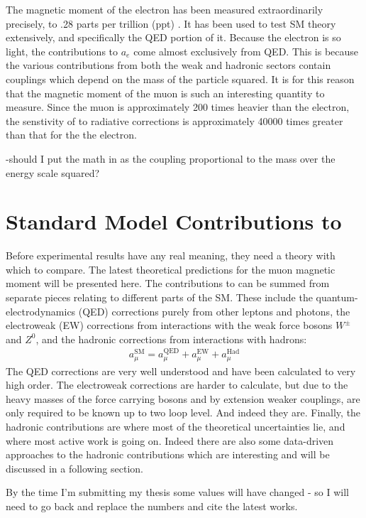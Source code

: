 The magnetic moment of the electron has been measured extraordinarily precisely, to .28 parts per trillion (ppt) \cite{ElectronMDM}. It has been used to test SM theory extensively, and specifically the QED portion of it. Because the electron is so light, the contributions to $a_{e}$ come almost exclusively from QED. This is because the various contributions from both the weak and hadronic sectors contain couplings which depend on the mass of the particle squared. It is for this reason that the magnetic moment of the muon is such an interesting quantity to measure. Since the muon is approximately 200 times heavier than the electron, the senstivity of \amu to radiative corrections is approximately 40000 times greater than that for the the electron.

-should I put the math in as the coupling proportional to the mass over the energy scale squared?

\section{Standard Model Contributions to \amu}
\label{sec:Theory}


Before experimental results have any real meaning, they need a theory with which to compare. The latest theoretical predictions for the muon magnetic moment will be presented here. The contributions to \amu can be summed from separate pieces relating to different parts of the SM. These include the quantum-electrodynamics (QED) corrections purely from other leptons and photons, the electroweak (EW) corrections from interactions with the weak force bosons $W^{\pm}$ and $Z^{0}$, and the hadronic corrections from interactions with hadrons: 
		\begin{align}
            a_{\mu}^{\text{SM}} = a_{\mu}^{\text{QED}} + a_{\mu}^{\text{EW}} + a_{\mu}^{\text{Had}}
		\end{align}
The QED corrections are very well understood and have been calculated to very high order. The electroweak corrections are harder to calculate, but due to the heavy masses of the force carrying bosons and by extension weaker couplings, are only required to be known up to two loop level. And indeed they are. Finally, the hadronic contributions are where most of the theoretical uncertainties lie, and where most active work is going on. Indeed there are also some data-driven approaches to the hadronic contributions which are interesting and will be discussed in a following section.

By the time I'm submitting my thesis some values will have changed - so I will need to go back and replace the numbers and cite the latest works.


